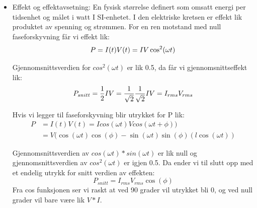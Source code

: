 \documentclass[norsk,a4paper,12pt]{article}
\begin{document}
\begin{itemize}
\item Effekt og effektavsetning: En fysisk størrelse definert som omsatt energi per tidsenhet og målet i watt I SI-enhetet. I den elektriske kretsen er effekt lik produktet av spenning og strømmen. For en ren motstand med null faseforskyvning får vi effekt lik: %
\begin{equation}
P=I(t)V(t)=IV\cos^2(\omega t)\\
\label{eq: }
\end{equation}

Gjennomsnittsverdien for $cos^2(\omega t)$ er lik 0.5, da får vi gjennomsnittseffekt lik: 
\begin{equation}
P_{snitt}=\frac12IV=\frac1{\sqrt2}\frac1{\sqrt2}IV=I_{rms}V_{rms}\\
\label{eq: }
\end{equation}

Hvis vi legger til faseforskyvning blir utrykket for P lik: 
\begin{equation}
\begin{split}
P & =I(t)V(t)=Icos(\omega t)Vcos(\omega t+\phi)) \\
 & =V(\cos(\omega t)\cos(\phi) -\sin(\omega t)\sin(\phi) (l\cos(\omega t)) 
\end{split}
\label{P_fase}
\end{equation}

Gjennomsnittsverdien av   $cos(\omega t)*sin(\omega t)$ er lik null og
gjennomsnittsverdien av  $cos^2(\omega t)$ er igjen 0.5. Da ender vi til slutt opp med et endelig utrykk for snitt verdien av effekten: 
\begin{equation}
P_{snitt}=I_{rms}V_{rms}\cos(\phi)
\label{eq: P_snitt}
\end{equation}
Fra cos funksjonen ser vi raskt at ved 90 grader vil utrykket bli 0, og ved null grader vil bare være lik $V*I$.


\end{itemize}
\end{document}
